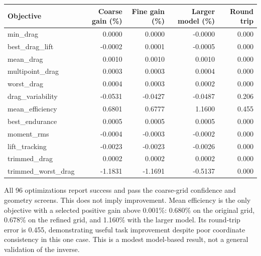 \begin{center}\small\begin{tabular}{lrrrr}\toprule Objective & Coarse gain (\%) & Fine gain (\%) & Larger model (\%) & Round trip\\\midrule

min\_drag & 0.0000 & 0.0000 & -0.0000 & 0.000 \\

best\_drag\_lift & -0.0002 & 0.0001 & -0.0005 & 0.000 \\

mean\_drag & 0.0010 & 0.0010 & 0.0010 & 0.000 \\

multipoint\_drag & 0.0003 & 0.0003 & 0.0004 & 0.000 \\

worst\_drag & 0.0004 & 0.0003 & 0.0002 & 0.000 \\

drag\_variability & -0.0531 & -0.0427 & -0.0487 & 0.206 \\

mean\_efficiency & 0.6801 & 0.6777 & 1.1600 & 0.455 \\

best\_endurance & 0.0005 & 0.0005 & 0.0005 & 0.000 \\

moment\_rms & -0.0004 & -0.0003 & -0.0002 & 0.000 \\

lift\_tracking & -0.0023 & -0.0023 & -0.0026 & 0.000 \\

trimmed\_drag & 0.0002 & 0.0002 & 0.0002 & 0.000 \\

trimmed\_worst\_drag & -1.1831 & -1.1691 & -0.5137 & 0.000 \\

\bottomrule\end{tabular}\end{center}

All 96 optimizations report success and pass the coarse-grid confidence and geometry screens. This does not imply improvement. Mean efficiency is the only objective with a selected positive gain above 0.001\%: 0.680\% on the original grid, 0.678\% on the refined grid, and 1.160\% with the larger model. Its round-trip error is 0.455, demonstrating useful task improvement despite poor coordinate consistency in this one case. This is a modest model-based result, not a general validation of the inverse.


